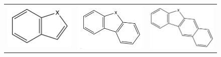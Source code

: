 	\begin{figure}[H]
		\begin{center}
			\begin{tabular}{c c c}
				\includegraphics[scale=0.15]{image/benzo} & \includegraphics[scale=0.13]{image/dibenzo} & \includegraphics[scale=0.12]{image/benzonaphto}\\

\end{tabular}
\end{center}
\end{figure}
